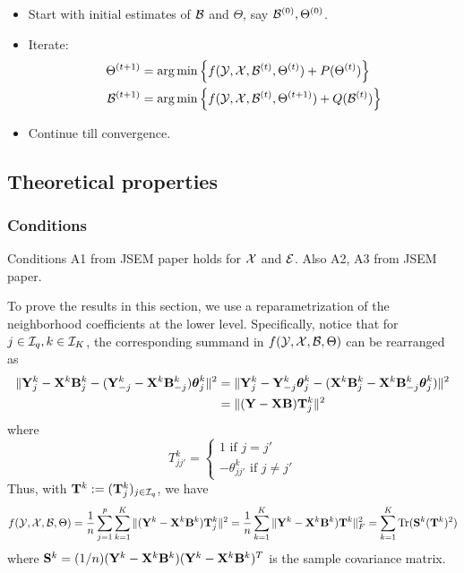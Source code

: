 \begin{itemize}
\item Start with initial estimates of ${\cal{B}}$ and $\Theta$, say ${\cal{B}}^{(0)}, \Theta^{(0)}$.
\item Iterate:
%
\begin{align}
\Theta^{(t+1)} &= \operatorname*{arg\,min} \left\{ f ( {\cal{Y}}, {\cal{X}}, {\cal{B}}^{(t)}, \Theta^{(t)}) + P (\Theta^{(t)}) \right\}\\
{\cal{B}}^{(t+1)} &= \operatorname*{arg\,min} \left\{ f ( {\cal{Y}}, {\cal{X}}, {\cal{B}}^{(t)}, \Theta^{(t+1)}) + Q ({\cal{B}}^{(t)}) \right\}
\end{align}
\item Continue till convergence.
\end{itemize}
%

\subsection{Theoretical properties}




\subsubsection{Conditions}
Conditions A1 from JSEM paper holds for ${\cal{X}}$ and ${\cal{E}}$. Also A2, A3 from JSEM paper.

To prove the results in this section, we use a reparametrization of the neighborhood coefficients at the lower level. Specifically, notice that for $j \in {\cal{I}}_q, k \in {\cal{I}}_K$, the corresponding summand in $f({\cal{Y}}, {\cal{X}}, {\cal{B}}, \Theta)$ can be rearranged as
%
\begin{align*}
\| {\mathbf{Y}}^k_j - {\mathbf{X}}^k {\mathbf{B}}_j^k - ({\mathbf{Y}}_{-j}^k - {\mathbf{X}}^k {\mathbf{B}}_{-j}^k) {\boldsymbol{\theta}}_j^k \|^2 &=
\| {\mathbf{Y}}^k_j - {\mathbf{Y}}_{-j}^k {\boldsymbol{\theta}}_j^k - ({\mathbf{X}}^k {\mathbf{B}}_j^k -{\mathbf{X}}^k {\mathbf{B}}_{-j}^k {\boldsymbol{\theta}}_j^k) \|^2 \\
&= \| ( {\mathbf{Y}} - {\mathbf{X}} {\mathbf{B}} ) {\mathbf{T}}_j^k \|^2
\end{align*}
%
where
%
$$
T_{jj'}^k = \begin{cases}
1 \text{ if } j = j'\\
- \theta_{jj'}^k \text{ if } j \neq j'
\end{cases}
$$
%
Thus, with ${\mathbf{T}}^k := ({\mathbf{T}}_j^k)_{j \in {\cal{I}}_q}$, we have
$$
f( {\cal{Y}}, {\cal{X}}, {\cal{B}}, \Theta) = \frac{1}{n} \sum_{j=1}^p \sum_{k=1}^K \| ( {\mathbf{Y}}^k - {\mathbf{X}}^k {\mathbf{B}}^k ) {\mathbf{T}}_j^k \|^2
= \frac{1}{n} \sum_{k=1}^K \| {\mathbf{Y}}^k - {\mathbf{X}}^k {\mathbf{B}}^k ) {\mathbf{T}}^k \|_F^2
= \sum_{k=1}^K \operatorname*{Tr} ({\mathbf{S}}^k ({\mathbf{T}}^k)^2 )
$$
%
where ${\mathbf{S}}^k = (1/n) ({\mathbf{Y}}^k - {\mathbf{X}}^k {\mathbf{B}}^k) ({\mathbf{Y}}^k - {\mathbf{X}}^k {\mathbf{B}}^k)^T$ is the sample covariance matrix.

